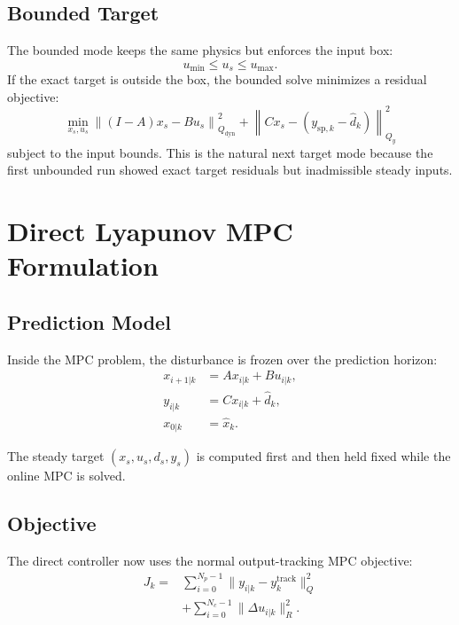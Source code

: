 \documentclass[11pt]{article}
\begin{document}
\subsection{Bounded Target}

The bounded mode keeps the same physics but enforces the input box:
\begin{equation}
u_{\min} \le u_s \le u_{\max}.
\end{equation}
If the exact target is outside the box, the bounded solve minimizes a residual
objective:
\begin{equation}
\min_{x_s,u_s}
\left\|(I-A)x_s-Bu_s\right\|_{Q_{\mathrm{dyn}}}^2
+
\left\|Cx_s-(y_{\mathrm{sp},k}-\hat d_k)\right\|_{Q_y}^2
\end{equation}
subject to the input bounds. This is the natural next target mode because the
first unbounded run showed exact target residuals but inadmissible steady
inputs.

\section{Direct Lyapunov MPC Formulation}

\subsection{Prediction Model}

Inside the MPC problem, the disturbance is frozen over the prediction horizon:
\begin{align}
x_{i+1|k} &= A x_{i|k}+B u_{i|k},\\
y_{i|k} &= Cx_{i|k}+\hat d_k,\\
x_{0|k} &= \hat x_k.
\end{align}

The steady target \((x_s,u_s,d_s,y_s)\) is computed first and then held fixed
while the online MPC is solved.

\subsection{Objective}

The direct controller now uses the normal output-tracking MPC objective:
\begin{align}
J_k =
&\sum_{i=0}^{N_p-1}
\|y_{i|k}-y_k^{\mathrm{track}}\|_Q^2
\nonumber\\
&+
\sum_{i=0}^{N_c-1}
\|\Delta u_{i|k}\|_R^2.
\label{eq:direct_objective}
\end{align}
\end{document}
